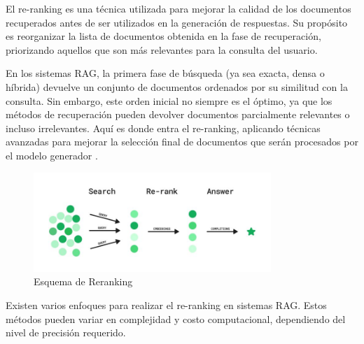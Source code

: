 El re-ranking es una técnica utilizada para mejorar la calidad de los documentos recuperados antes de ser utilizados en la generación de respuestas. 
Su propósito es reorganizar la lista de documentos obtenida en la fase de recuperación, priorizando aquellos que son más relevantes para la consulta del usuario.

En los sistemas RAG, la primera fase de búsqueda (ya sea exacta, densa o híbrida) devuelve un conjunto de documentos ordenados por su similitud con la consulta. 
Sin embargo, este orden inicial no siempre es el óptimo, ya que los métodos de recuperación pueden devolver documentos parcialmente relevantes o incluso irrelevantes. 
Aquí es donde entra el re-ranking, aplicando técnicas avanzadas para mejorar la selección final de documentos que serán procesados por el modelo generador \cite{mortaheb2025rerankingcontextmultimodalretrieval}.

\begin{figure}[h]
	\centering
	\includegraphics[width=0.8\textwidth]{figs/rerank.jpg}
	\caption{Esquema de Reranking}
	\label{fig:context-anoni1}
\end{figure}

Existen varios enfoques para realizar el re-ranking en sistemas RAG. Estos métodos pueden variar en complejidad y costo computacional, dependiendo del nivel de precisión requerido.

